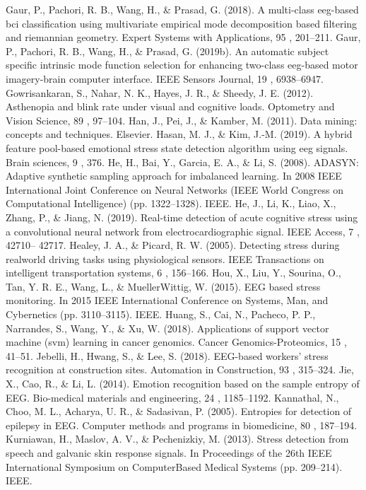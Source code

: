 Gaur, P., Pachori, R. B., Wang, H., \& Prasad, G. (2018). A multi-class eeg-based bci classification using multivariate empirical mode decomposition based filtering and riemannian geometry. Expert Systems with Applications, 95 , 201–211.
Gaur, P., Pachori, R. B., Wang, H., \& Prasad, G. (2019b). An automatic subject specific intrinsic mode function selection for enhancing two-class eeg-based motor imagery-brain computer interface. IEEE Sensors Journal, 19 , 6938–6947.
Gowrisankaran, S., Nahar, N. K., Hayes, J. R., \& Sheedy, J. E. (2012). Asthenopia and blink rate under visual and cognitive loads. Optometry and Vision Science, 89 , 97–104.
Han, J., Pei, J., \& Kamber, M. (2011). Data mining: concepts and techniques. Elsevier.
Hasan, M. J., \& Kim, J.-M. (2019). A hybrid feature pool-based emotional stress state detection algorithm using eeg signals. Brain sciences, 9 , 376.
He, H., Bai, Y., Garcia, E. A., \& Li, S. (2008). ADASYN: Adaptive synthetic sampling approach for imbalanced learning. In 2008 IEEE International Joint Conference on Neural Networks (IEEE World Congress on Computational Intelligence) (pp. 1322–1328). IEEE.
He, J., Li, K., Liao, X., Zhang, P., \& Jiang, N. (2019). Real-time detection of acute cognitive stress using a convolutional neural network from electrocardiographic signal. IEEE Access, 7 , 42710– 42717.
Healey, J. A., \& Picard, R. W. (2005). Detecting stress during realworld driving tasks using physiological sensors. IEEE Transactions on intelligent transportation systems, 6 , 156–166.
Hou, X., Liu, Y., Sourina, O., Tan, Y. R. E., Wang, L., \& MuellerWittig, W. (2015). EEG based stress monitoring. In 2015 IEEE International Conference on Systems, Man, and Cybernetics (pp. 3110–3115). IEEE.
Huang, S., Cai, N., Pacheco, P. P., Narrandes, S., Wang, Y., \& Xu, W. (2018). Applications of support vector machine (svm) learning in cancer genomics. Cancer Genomics-Proteomics, 15 , 41–51.
Jebelli, H., Hwang, S., \& Lee, S. (2018). EEG-based workers’ stress recognition at construction sites. Automation in Construction, 93 , 315–324.
Jie, X., Cao, R., \& Li, L. (2014). Emotion recognition based on the sample entropy of EEG. Bio-medical materials and engineering, 24 , 1185–1192.
Kannathal, N., Choo, M. L., Acharya, U. R., \& Sadasivan, P. (2005). Entropies for detection of epilepsy in EEG. Computer methods and programs in biomedicine, 80 , 187–194.
Kurniawan, H., Maslov, A. V., \& Pechenizkiy, M. (2013). Stress detection from speech and galvanic skin response signals. In Proceedings of the 26th IEEE International Symposium on ComputerBased Medical Systems (pp. 209–214). IEEE.
